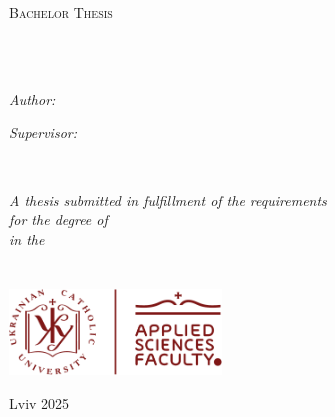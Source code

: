 \documentclass[
11pt, %
oneside, %
ukrainian,
english, %
singlespacing, %
headsepline, %
]{BachelorMasterThesis} %
\author{Andrii \textsc{Yaroshevych}}
\begin{document}
\frontmatter
\pagestyle{plain}


\begin{titlepage}
\begin{center}

\vspace*{.06\textheight}
{\scshape\LARGE \univname\par}\vspace{1.5cm}
\textsc{\Large Bachelor Thesis}\\[0.5cm]

\HRule \\[0.4cm]
{\huge \bfseries \ttitle\par}\vspace{0.4cm}
\HRule \\[1.5cm]
 
\begin{minipage}[t]{0.4\textwidth}
\begin{flushleft} \large
\emph{Author:}\\
\href{https://www.researchgate.net/profile/Andrii-Yaroshevych}{\authorname}
\end{flushleft}
\end{minipage}
\begin{minipage}[t]{0.4\textwidth}
\begin{flushright} \large
\emph{Supervisor:} \\
\href{https://www.researchgate.net/profile/Oleg-Farenyuk}{\supname}
\end{flushright}
\end{minipage}\\[3cm]
 
\vfill

\large \textit{A thesis submitted in fulfillment of the requirements\\ for the degree of \degreename}\\[0.3cm] %
\textit{in the}\\[0.4cm]
\facname\\\deptname\\[2cm]
 
\vfill
\includegraphics[height=2.3cm]{UCU_APPS_logo}

\vfill
{\large Lviv 2025}\\[4cm]
 
\vfill
\end{center}
\end{titlepage}
\end{document}
